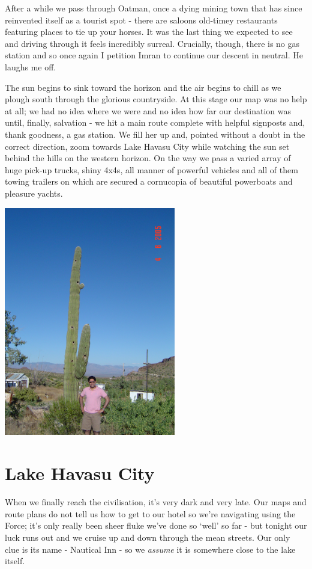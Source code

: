 \documentclass[a5paper,titlepage,11pt,draft]{book}
\begin{document}
After a while we pass through Oatman, once a dying mining town that has since reinvented itself as a tourist spot - there are saloons old-timey restaurants featuring places to tie up your horses.  It was the last thing we expected to see and driving through it feels incredibly surreal.  Crucially, though, there is no gas station and so once again I petition Imran to continue our descent in neutral.  He laughs me off.

The sun begins to sink toward the horizon and the air begins to chill as we plough south through the glorious countryside.  At this stage our map was no help at all; we had no idea where we were and no idea how far our destination was until, finally, salvation - we hit a main route complete with helpful signposts and, thank goodness, a gas station.  We fill her up and, pointed without a doubt in the correct direction, zoom towards Lake Havasu City while watching the sun set behind the hills on the western horizon.  On the way we pass a varied array of huge pick-up trucks, shiny 4x4s, all manner of powerful vehicles and all of them towing trailers on which are secured a cornucopia of beautiful powerboats and pleasure yachts.

\begin{center}\includegraphics[height=100mm]{gfx/DSC00701}\end{center}

\section*{Lake Havasu City}
When we finally reach the civilisation, it's very dark and very late.  Our maps and route plans do not tell us how to get to our hotel so we're navigating using the Force; it's only really been sheer fluke we've done so `well' so far - but tonight our luck runs out and we cruise up and down through the mean streets.  Our only clue is its name - Nautical Inn - so we \emph{assume} it is somewhere close to the lake itself.
\end{document}
